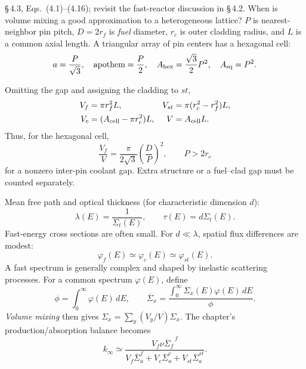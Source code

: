 \documentclass{ne630handout}
\begin{document}
\fontsize{9.5}{11.5}\selectfont
\RaggedRight

 {\S\,4.3, Eqs.\ (4.1)--(4.16); revisit the fast-reactor discussion in \S\,4.2.}
 {When is volume mixing a good approximation to a heterogeneous lattice?}
\colstart
{}
$P$ is nearest-neighbor pin pitch, $D=2r_f$ is \emph{fuel} diameter, $r_c$ is outer cladding radius, and $L$ is a common axial length. A triangular array of pin centers has a hexagonal cell:
\[
 a=\frac{P}{\sqrt3},\quad \text{apothem}=\frac P2,\quad
 A_{\rm hex}=\frac{\sqrt3}{2}P^2,\quad A_{\rm sq}=P^2.
\]
\begin{center}\resizebox{.74\linewidth}{!}{\PinCellsFigure}\end{center}
\vspace{-6pt}
Omitting the gap and assigning the cladding to $st$,
\begin{align*}
 V_f&=\pi r_f^2L, & V_{st}&=\pi(r_c^2-r_f^2)L,\\
 V_c&=(A_{\rm cell}-\pi r_c^2)L, & V&=A_{\rm cell}L.
\end{align*}
Thus, for the hexagonal cell,
\[
 \frac{V_f}{V}=\frac{\pi}{2\sqrt3}\left(\frac DP\right)^2,
 \qquad P>2r_c
\]
for a nonzero inter-pin coolant gap. Extra structure or a fuel--clad gap must be counted separately.

Mean free path and optical thickness (for characteristic dimension $d$):
\[
 \lambda(E)=\frac1{\Sigma_t(E)},\qquad
 \tau(E)=d \Sigma_t(E).
\]
Fast-energy cross sections are often small. For $d \ll\lambda$, spatial flux differences are modest:
\[
 \varphi_f(E)\simeq\varphi_c(E)\simeq\varphi_{st}(E).
\]
A fast spectrum is generally complex and shaped by inelastic scattering processes.
\colnext
{}
For a common spectrum $\varphi(E)$, define
\[
 \phi=\int_0^\infty\varphi(E)\,dE,\qquad
 \overline\Sigma_x=\frac{\int_0^\infty\Sigma_x(E)\varphi(E)\,dE}{\phi}.
\]
{\it Volume mixing} then gives $\Sigma_x=\sum_y(V_y/V)\Sigma_x$. The chapter's production/absorption balance becomes
\[
 \boxed{k_\infty\simeq
 \frac{V_f\overline{\nu\Sigma_f}^{\,f}}
 {V_f\overline\Sigma_a^f+V_c\overline\Sigma_a^c+V_{st}\overline\Sigma_a^{st}}.}
\]
\end{document}
